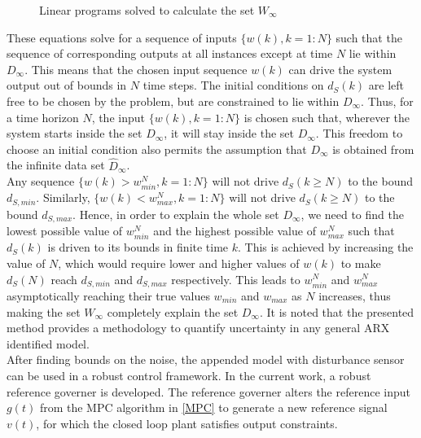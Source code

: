 \documentclass[letterpaper, 10 pt, conference]{ieeeconf}  %
\begin{document}
\begin{enumerate}
\begin{figure}[h]
\begin{center}
	\end{center}\mbox{} 
	\label{bounds}
	\caption{Linear programs solved to calculate the set $W_{\infty}$}
	\end{figure}
	These equations solve for a sequence of inputs $\{w(k), k={1:N}\}$ such that the sequence of corresponding outputs at all instances except at time $N$ lie within $D_{\infty}$. This means that the chosen input sequence $w(k)$ can drive the system output out of bounds in $N$ time steps. The initial conditions on $d_S(k)$ are left free to be chosen by the problem, but are constrained to lie within $D_{\infty}$. Thus, for a time horizon $N$, the input $\{w(k), k={1:N}\}$ is chosen such that, wherever the system starts inside the set $D_{\infty}$, it will stay inside the set $D_{\infty}$. This freedom to choose an initial condition also permits the assumption that $D_{\infty}$ is obtained from the infinite data set $_{\infty}$.
	\\
	\noindent
	Any sequence $\{w(k)>w^N_{min},k=1:N\}$ will not drive $d_S(k \geq N)$ to the bound $d_{S,min}$. Similarly, $\{w(k)<w^N_{max},k=1:N\}$ will not drive $d_S(k \geq N)$ to the bound $d_{S,max}$. Hence, in order to explain the whole set $D_{\infty}$, we need to find the lowest possible value of $w^N_{min}$ and the highest possible value of $w^N_{max}$ such that $d_S(k)$ is driven to its bounds in finite time $k$. This is achieved by increasing the value of $N$, which would require lower and higher values of $w(k)$ to make $d_S(N)$ reach $d_{S,min}$ and $d_{S,max}$ respectively. This leads to $w^N_{min}$ and $w^N_{max}$ asymptotically reaching their true values $w_{min}$ and $w_{max}$ as $N$ increases, thus making the set $W_{\infty}$ completely explain the set $D_{\infty}$. It is noted that the presented method provides a methodology to quantify uncertainty in any general ARX identified model.
	\\
	After finding bounds on the noise, the appended model with disturbance sensor can be used in a robust control framework. In the current work, a robust reference governer is developed. The reference governer alters the reference input $g(t)$ from the MPC algorithm in \eqref{MPC} to generate a new reference signal $v(t)$, for which the closed loop plant satisfies output constraints.

\end{enumerate}
\end{document}
